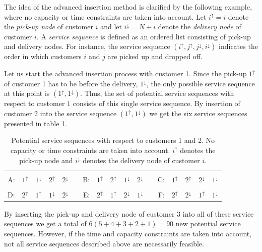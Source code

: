\documentclass[dissertation,draft*]{aaltoseries}
\begin{document}
The idea of the advanced insertion method is 
clarified by the following example, where no
capacity or time constraints are taken into account. 
Let $i^{\uparrow} = i$ denote the \emph{pick-up node} of customer $i$ and let $i^{\downarrow} = N + i$ denote 
the \emph{delivery node} of customer $i$.
A \emph{service sequence} is defined as an ordered list consisting of pick-up and delivery nodes.
For instance, the service sequence $( i^{\uparrow},  j^{\uparrow}, j^{\downarrow}, i^{\downarrow})$ indicates the order
in which customers $i$ and $j$ are picked up and dropped off.

Let us start the advanced insertion process with customer 1.
Since the pick-up $1^{\uparrow}$ of customer 1 has to be before the delivery, $1^{\downarrow}$, 
the only possible service sequence at this point is $( 1^{\uparrow},  1^{\downarrow})$. Thus, the 
set of potential service sequences with respect to customer $1$ consists of this single service sequence. 
By insertion of customer $2$ into the service sequence $( 1^{\uparrow}, 1^{\downarrow})$ we get the six 
service sequences presented in table \ref{ykskakstaulukko01}.
\begin{table}[ht] 
\caption{Potential service sequences with respect to customers 1 and 2. 
No capacity or time constraints are taken into account. 
$i^{\uparrow}$ denotes the pick-up node and $i^{\downarrow}$ denotes
the delivery node of customer $i$.} 
\centering     
\begin{tabular}{|rrrrrr|rrrrrr|rrrrr|}  
\hline  & & & & & & & & & & & &  & & & &  \\ [-0.7em]                
A: & $ 1^{\uparrow} $ & $  1^{\downarrow} $ & $  2^{\uparrow} $ & $  2^{\downarrow} $ & & 
B: & $ 1^{\uparrow} $ & $  2^{\uparrow} $ & $  1^{\downarrow} $ & $  2^{\downarrow} $ & & 
C: & $ 1^{\uparrow} $ & $  2^{\uparrow} $ & $  2^{\downarrow} $ & $  1^{\downarrow} $ \\ [1ex]
\hline & & & & & & & & & & & &  & & & &  \\ [-0.7em]
D: & $ 2^{\uparrow} $ & $  1^{\uparrow} $ & $  1^{\downarrow} $ & $  2^{\downarrow} $ & & 
E: & $ 2^{\uparrow} $ & $  1^{\uparrow} $ & $ 2^{\downarrow} $ & $  1^{\downarrow} $ & & 
F: & $ 2^{\uparrow} $ & $  2^{\downarrow} $ & $  1^{\uparrow} $ & $  1^{\downarrow} $ \\ [1ex] 
\hline                      
\end{tabular} 
\label{ykskakstaulukko01} 
\end{table} 


By inserting the pick-up and delivery node of customer $3$ into all of these service sequences we get a total
of $6(5+4+3+2+1) = 90$ new potential service sequences. However, if the time and capacity
constraints are taken into account, not all service sequences described above are necessarily feasible.
\end{document}
